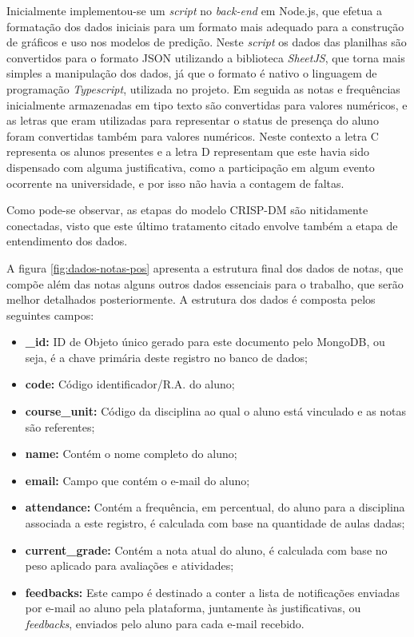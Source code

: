 Inicialmente implementou-se um \textit{script} no \textit{back-end} em Node.js, que efetua a formatação dos dados iniciais para um formato mais adequado para a construção de gráficos e uso nos modelos de predição.
Neste \textit{script} os dados das planilhas são convertidos para o formato JSON utilizando a biblioteca \textit{SheetJS}, que torna mais simples a manipulação dos dados, já que o formato é nativo o linguagem de programação \textit{Typescript}, utilizada no projeto.
Em seguida as notas e frequências inicialmente armazenadas em tipo texto são convertidas para valores numéricos, e as letras que eram utilizadas para representar o status de presença do aluno foram convertidas também para valores numéricos.
Neste contexto a letra C representa os alunos presentes e a letra D representam que este havia sido dispensado com alguma justificativa, como a participação em algum evento ocorrente na universidade, e por isso não havia a contagem de faltas.

Como pode-se observar, as etapas do modelo CRISP-DM são nitidamente conectadas, visto que este último tratamento citado envolve também a etapa de entendimento dos dados. 

A figura \ref{fig:dados-notas-pos} apresenta a estrutura final dos dados de notas, que compõe além das notas alguns outros dados essenciais para o trabalho, que serão melhor detalhados posteriormente. 
A estrutura dos dados é composta pelos seguintes campos:

\begin{itemize}[topsep=5pt]
    \item \textbf{\_id:} ID de Objeto único gerado para este documento pelo MongoDB, ou seja, é a chave primária deste registro no banco de dados;
    \item \textbf{code:} Código identificador/R.A. do aluno;
    \item \textbf{course\_unit:} Código da disciplina ao qual o aluno está vinculado e as notas são referentes;
    \item \textbf{name:} Contém o nome completo do aluno;
    \item \textbf{email:} Campo que contém o e-mail do aluno;
    \item \textbf{attendance:} Contém a frequência, em percentual, do aluno para a disciplina associada a este registro, é calculada com base na quantidade de aulas dadas;
    \item \textbf{current\_grade:} Contém a nota atual do aluno, é calculada com base no peso aplicado para avaliações e atividades;
    \item \textbf{feedbacks:} Este campo é destinado a conter a lista de notificações enviadas por e-mail ao aluno pela plataforma, juntamente às justificativas, ou \textit{feedbacks}, enviados pelo aluno para cada e-mail recebido.
\end{itemize}


